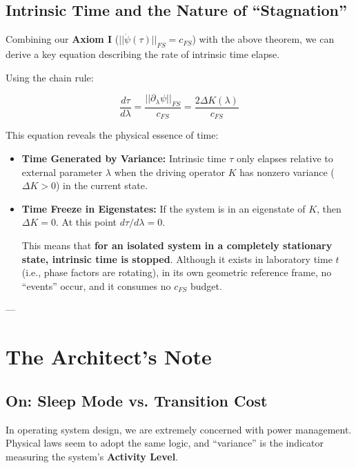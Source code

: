 \documentclass[11pt,a4paper,twoside]{book}
\begin{document}
\subsection{Intrinsic Time and the Nature of ``Stagnation''}

Combining our \textbf{Axiom I} (\textbf{$||\dot{\psi}(\tau)||_{FS} = c_{FS}$}) with the above theorem, we can derive a key equation describing the rate of intrinsic time elapse.

Using the chain rule:

$$\frac{d\tau}{d\lambda} = \frac{||\partial_{\lambda}\psi||_{FS}}{c_{FS}} = \frac{2\Delta K(\lambda)}{c_{FS}}$$

This equation reveals the physical essence of time:

\begin{itemize}
\item \textbf{Time Generated by Variance:} Intrinsic time \textbf{$\tau$} only elapses relative to external parameter \textbf{$\lambda$} when the driving operator \textbf{$K$} has nonzero variance (\textbf{$\Delta K > 0$}) in the current state.

\item \textbf{Time Freeze in Eigenstates:} If the system is in an eigenstate of \textbf{$K$}, then \textbf{$\Delta K = 0$}. At this point \textbf{$d\tau/d\lambda = 0$}.

   This means that \textbf{for an isolated system in a completely stationary state, intrinsic time is stopped}. Although it exists in laboratory time \textbf{$t$} (i.e., phase factors are rotating), in its own geometric reference frame, no ``events'' occur, and it consumes no \textbf{$c_{FS}$} budget.
\end{itemize}

---

\section{The Architect's Note}

\subsection{On: Sleep Mode vs. Transition Cost}

In operating system design, we are extremely concerned with power management. Physical laws seem to adopt the same logic, and ``variance'' is the indicator measuring the system's \textbf{Activity Level}.
\end{document}
